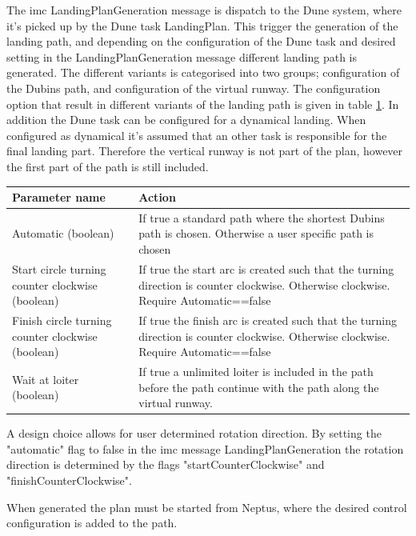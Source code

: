 The \gls{imc} LandingPlanGeneration message is dispatch to the Dune system, where it's picked up by the Dune task LandingPlan. This trigger the generation of the landing path, and depending on the configuration of the Dune task and desired setting in the LandingPlanGeneration message different landing path is generated. The different variants is categorised into two groups; configuration of the Dubins path, and configuration of the virtual runway. The configuration option that result in different variants of the landing path is given in table \ref{Tb:DubinConfig}. In addition the Dune task can be configured for a dynamical landing. When configured as dynamical it's assumed that an other task is responsible for the final landing part. Therefore the vertical runway is not part of the plan, however the first part of the path is still included.
\begin{table}
\centering
\begin{tabular}{| p{2.7cm} | | p{6cm} |}
\hline
\textbf{Parameter name} 							& \textbf{Action} \\ \hline
 Automatic (boolean)								& If true a standard path where the shortest Dubins path is chosen. Otherwise a user specific path is chosen \\ \hline
Start circle turning counter clockwise (boolean)	& If true the start arc is created such that the turning direction is counter clockwise. Otherwise clockwise. Require Automatic==false \\ \hline
Finish circle turning counter clockwise (boolean)	& If true the finish arc is created such that the turning direction is counter clockwise. Otherwise clockwise. Require Automatic==false \\ \hline
Wait at loiter (boolean)							& If true a unlimited loiter is included in the path before the path continue with the path along the virtual runway. \\ \hline

\end{tabular}
\label{Tb:DubinConfig}
\end{table}

A design choice allows for user determined rotation direction. By setting the "automatic" flag to false in the \gls{imc} message LandingPlanGeneration the rotation direction is determined by the flags "startCounterClockwise" and "finishCounterClockwise".


When generated the plan must be started from Neptus, where the desired control configuration is added to the path.

